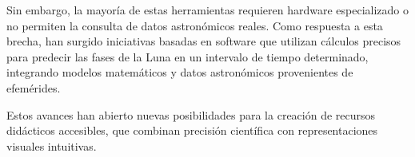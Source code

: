 
Sin embargo, la mayoría de estas herramientas requieren hardware especializado o no permiten la consulta de datos astronómicos reales. 
Como respuesta a esta brecha, han surgido iniciativas basadas en software que utilizan cálculos precisos para predecir las fases de la Luna
en un intervalo de tiempo determinado, integrando modelos matemáticos y datos astronómicos provenientes de efemérides.

Estos avances han abierto nuevas posibilidades para la creación de recursos didácticos accesibles, que combinan precisión científica con representaciones visuales intuitivas.